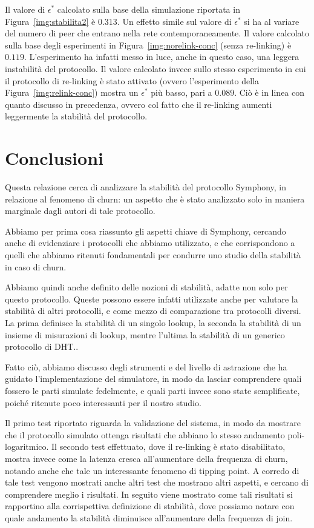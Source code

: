 \documentclass[prodmode,acmtap]{acmlarge}
\begin{document}
Il valore di $\epsilon^*$ calcolato sulla base della simulazione riportata in Figura~\ref{img:stabilita2} è $0.313$.
Un effetto simile sul valore di $\epsilon^*$ si ha al variare del numero di peer che entrano nella rete contemporaneamente. Il valore calcolato sulla base degli esperimenti in Figura~\ref{img:norelink-conc} (senza re-linking) è $0.119$. L'esperimento ha infatti messo in luce, anche in questo caso, una leggera instabilità del protocollo. Il valore calcolato invece sullo stesso esperimento in cui il protocollo di re-linking è stato attivato (ovvero l'esperimento della Figura~\ref{img:relink-conc}) mostra un $\epsilon^*$ più basso, pari a $0.089$. Ciò è in linea con quanto discusso in precedenza, ovvero col fatto che il re-linking aumenti leggermente la stabilità del protocollo.



\section{Conclusioni} \label{conclusioni}

Questa relazione cerca di analizzare la stabilità del protocollo Symphony, in relazione al fenomeno di churn: un aspetto che è stato analizzato solo in maniera marginale dagli autori di tale protocollo. 

Abbiamo per prima cosa riassunto gli aspetti chiave di Symphony, cercando anche di evidenziare i protocolli che abbiamo utilizzato, e che corrispondono a quelli che abbiamo ritenuti fondamentali per condurre uno studio della stabilità in caso di churn. 

Abbiamo quindi anche definito delle nozioni di stabilità, adatte non solo per questo protocollo. Queste possono essere infatti utilizzate anche per valutare la stabilità di altri protocolli, e come mezzo di comparazione tra protocolli diversi. La prima definisce la stabilità di un singolo lookup, la seconda la stabilità di un insieme di misurazioni di lookup, mentre l'ultima la stabilità di un generico protocollo di DHT..

Fatto ciò, abbiamo discusso degli strumenti e del livello di astrazione che ha guidato l'implementazione del simulatore, in modo da lasciar comprendere quali fossero le parti simulate fedelmente, e quali parti invece sono state semplificate, poiché ritenute poco interessanti per il nostro studio.

Il primo test riportato riguarda la validazione del sistema, in modo da mostrare che il protocollo simulato ottenga risultati che abbiano lo stesso andamento poli-logaritmico. Il secondo test effettuato, dove il re-linking è stato disabilitato, mostra invece come la latenza cresca all'aumentare della frequenza di churn, notando anche che tale un interessante fenomeno di tipping point. A corredo di tale test vengono mostrati anche altri test che mostrano altri aspetti, e cercano di comprendere meglio i risultati. In seguito viene mostrato come tali risultati si rapportino alla corrispettiva definizione di stabilità, dove possiamo notare con quale andamento la stabilità diminuisce all'aumentare della frequenza di join.
\end{document}

